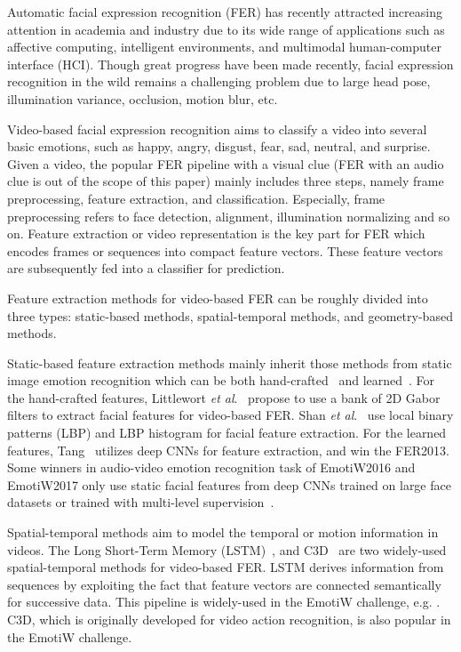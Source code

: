 \documentclass{article}
\begin{document}
Automatic facial expression recognition (FER) has recently attracted increasing attention in academia and industry due to its wide range of applications such as affective computing, intelligent environments, and multimodal human-computer interface (HCI). 
Though great progress have been made recently, facial expression recognition in the wild remains a challenging problem due to
large head pose, illumination variance, occlusion, motion blur, etc.

Video-based facial expression recognition aims to classify a video into several basic emotions, such as happy, angry, disgust, fear, sad, neutral, and surprise. Given a video, the popular FER pipeline with a visual clue (FER with an audio clue is out of the scope of this paper) mainly includes three steps, namely frame preprocessing,  feature extraction, and classification. Especially, frame preprocessing refers to face detection, alignment, illumination normalizing and so on. Feature extraction or video representation is the key part for FER which encodes frames or sequences into compact feature vectors. These feature vectors are subsequently fed into a classifier for prediction.

Feature extraction methods for video-based FER can be roughly divided into three types: static-based methods, spatial-temporal methods, and geometry-based methods.

Static-based feature extraction methods mainly inherit those methods from static image emotion recognition which can be both hand-crafted~\cite{Littlewort2006Dynamics,Shan2009Facial} and learned~\cite{Tang2013Deep,Bargal2016Emotion,Knyazev2017Convolutional}. For the hand-crafted features, Littlewort \textit{et al}.~\cite{Littlewort2006Dynamics} propose to use a bank of 2D Gabor filters to extract facial features for video-based FER. Shan \textit{et al}.~\cite{Shan2009Facial} use local binary patterns (LBP) and LBP histogram for facial feature extraction. 
For the learned features, 
Tang~\cite{Tang2013Deep} utilizes deep CNNs for feature extraction, and win the FER2013.
Some winners in audio-video emotion recognition task of EmotiW2016 and EmotiW2017 only use static facial features from deep CNNs trained on large face datasets or trained with multi-level supervision~\cite{Bargal2016Emotion,Knyazev2017Convolutional}. 

Spatial-temporal methods aim to model the temporal or motion information in videos. The  Long Short-Term Memory (LSTM)~\cite{Hochreiter1997Long}, and C3D~\cite{tran2015learning} are two widely-used spatial-temporal methods for video-based FER.  LSTM derives information from sequences by exploiting the fact that feature vectors are connected semantically for successive data. This pipeline is widely-used in the EmotiW challenge, e.g. \cite{Liu2016Video,ouyang2017audio,Vielzeuf2017Temporal,Yan2018Multi}. C3D, which is originally developed for video action recognition, is also popular in the EmotiW challenge. 
\end{document}
